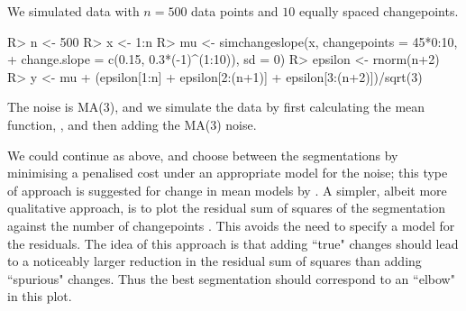 \documentclass[article]{jss}
\begin{document}
We simulated data with $n=500$ data points and $10$ equally spaced changepoints.
\begin{CodeChunk}
\begin{CodeInput}
R> n <- 500
R> x <- 1:n
R> mu <- simchangeslope(x, changepoints = 45*0:10, 
+  change.slope = c(0.15, 0.3*(-1)^(1:10)), sd = 0)
R> epsilon <- rnorm(n+2)
R> y <- mu + (epsilon[1:n] + epsilon[2:(n+1)] + epsilon[3:(n+2)])/sqrt(3)
\end{CodeInput}
\end{CodeChunk}
The noise is MA(3), and we simulate the data by first calculating the mean function, , and then adding the MA(3) noise.

We could continue as above, and choose between the segmentations by minimising a penalised cost under an appropriate model for the noise; this type of approach is suggested for change in mean models by \cite{cho2020multiple}. A simpler, albeit more qualitative approach, is to plot the residual sum of squares of the segmentation against the number of changepoints \citep{lebarbier2005detecting,baudry2012slope,fearnhead2020relating,fryzlewicz2020detecting}. This avoids the need to specify a model for the residuals. The idea of this approach is that adding ``true" changes should lead to a noticeably larger reduction in the residual sum of squares than adding ``spurious" changes. Thus the best segmentation should correspond to an ``elbow" in this plot.
\end{document}
